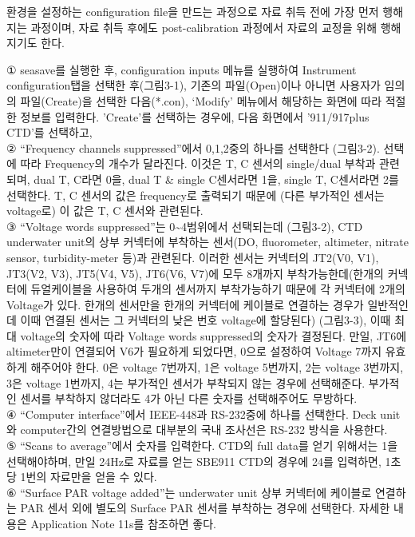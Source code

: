 \documentclass[
]{book}
\begin{document}
환경을 설정하는 configuration file을 만드는 과정으로 자료 취득 전에 가장 먼저 행해지는 과정이며, 자료 취득 후에도 post-calibration 과정에서 자료의 교정을 위해 행해지기도 한다.

① seasave를 실행한 후, configuration inputs 메뉴를 실행하여 Instrument configuration탭을 선택한 후(그림3-1), 기존의 파일(Open)이나 아니면 사용자가 임의의 파일(Create)을 선택한 다음(*.con), `Modify' 메뉴에서 해당하는 화면에 따라 적절한 정보를 입력한다. 'Create'를 선택하는 경우에, 다음 화면에서 '911/917plus CTD'를 선택하고,\\
② ``Frequency channels suppressed''에서 0,1,2중의 하나를 선택한다 (그림3-2). 선택에 따라 Frequency의 개수가 달라진다. 이것은 T, C 센서의 single/dual 부착과 관련되며, dual T, C라면 0을, dual T \& single C센서라면 1을, single T, C센서라면 2를 선택한다. T, C 센서의 값은 frequency로 출력되기 때문에 (다른 부가적인 센서는 voltage로) 이 값은 T, C 센서와 관련된다.\\
③ ``Voltage words suppressed''는 0\textasciitilde4범위에서 선택되는데 (그림3-2), CTD underwater unit의 상부 커넥터에 부착하는 센서(DO, fluorometer, altimeter, nitrate sensor, turbidity-meter 등)과 관련된다. 이러한 센서는 커넥터의 JT2(V0, V1), JT3(V2, V3), JT5(V4, V5), JT6(V6, V7)에 모두 8개까지 부착가능한데(한개의 커넥터에 듀얼케이블을 사용하여 두개의 센서까지 부착가능하기 때문에 각 커넥터에 2개의 Voltage가 있다. 한개의 센서만을 한개의 커넥터에 케이블로 연결하는 경우가 일반적인데 이때 연결된 센서는 그 커넥터의 낮은 번호 voltage에 할당된다) (그림3-3), 이때 최대 voltage의 숫자에 따라 Voltage words suppressed의 숫자가 결정된다. 만일, JT6에 altimeter만이 연결되어 V6가 필요하게 되었다면, 0으로 설정하여 Voltage 7까지 유효하게 해주어야 한다. 0은 voltage 7번까지, 1은 voltage 5번까지, 2는 voltage 3번까지, 3은 voltage 1번까지, 4는 부가적인 센서가 부착되지 않는 경우에 선택해준다. 부가적인 센서를 부착하지 않더라도 4가 아닌 다른 숫자를 선택해주어도 무방하다.\\
④ ``Computer interface''에서 IEEE-448과 RS-232중에 하나를 선택한다. Deck unit와 computer간의 연결방법으로 대부분의 국내 조사선은 RS-232 방식을 사용한다.\\
⑤ ``Scans to average''에서 숫자를 입력한다. CTD의 full data를 얻기 위해서는 1을 선택해야하며, 만일 24Hz로 자료를 얻는 SBE911 CTD의 경우에 24를 입력하면, 1초당 1번의 자료만을 얻을 수 있다.\\
⑥ ``Surface PAR voltage added''는 underwater unit 상부 커넥터에 케이블로 연결하는 PAR 센서 외에 별도의 Surface PAR 센서를 부착하는 경우에 선택한다. 자세한 내용은 Application Note 11s를 참조하면 좋다.\\
\end{document}
